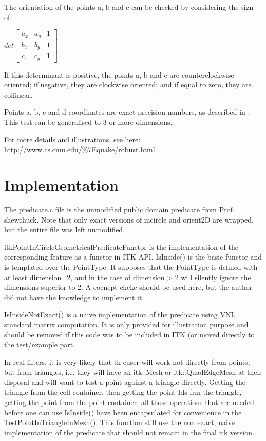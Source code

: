 \documentclass{InsightArticle}
\begin{document}
The orientation of the points a, b and c can be checked by considering the sign
of:

\begin{center}
\begin{math}
det
\begin{bmatrix}
a_x & a_y & 1 \\
b_x & b_y & 1 \\
c_x & c_y & 1
\end{bmatrix}
\end{math}
\end{center}

If this determinant is positive, the points a, b and c are counterclockwise
oriented; if negative, they are clockwise oriented; and if equal to zero, they
are collinear.

Points a, b, c and d coordinates are exact precision numbers, as described in
\cite{shewchuk97a}. This test can be generalised to 3 or more dimensions.

For more details and illustrations, see here:
\url{http://www.cs.cmu.edu/%7Equake/robust.html}

\section{Implementation}

The predicate.c file is the unmodified public domain predicate from Prof. shewchuck. Note that only exact versions of incircle and orient2D are wrapped, but the entire file was left unmodified.

itkPointInCircleGeometricalPredicateFunctor is the implementation of the corresponding feature as a functor in ITK API.
IsInside() is the basic functor and is templated over the PointType. It supposes that the PointType is defined with at least dimension=2, and in the case of dimension > 2 will silently ignore the dimensions superior to 2. A cocnept chekc should be used here, but the author did not have the knowledge to implement it.

IsInsideNotExact() is a naive implementation of the predicate using VNL standard matrix computation. It is only provided for illustration purpose and should be removed if this code was to be included in ITK (or moved directly to the test/example part.

In real filters, it is very likely that th euser will work not directly from points, but from triangles,
i.e. they will have an itk::Mesh or itk::QuadEdgeMesh at their disposal and will want to test a point
against a triangle directly. Getting the triangle from the cell container, then getting the point Ids frm the triangle,
getting the point from the point container, all those operations that are needed before one can use IsInside()
have been encapsulated for convenience in the TestPointInTriangleInMesh().
This function still use the non exact, naive implementation of the predicate that should not remain in the final itk version.
\end{document}
